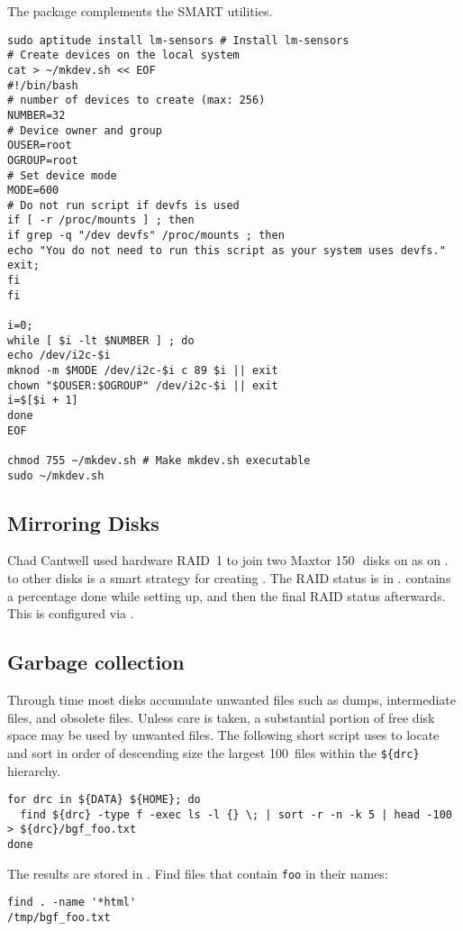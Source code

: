 \documentclass[12pt,twoside]{article}
\begin{document}
The  package complements the SMART utilities.
\begin{verbatim}
sudo aptitude install lm-sensors # Install lm-sensors
# Create devices on the local system
cat > ~/mkdev.sh << EOF
#!/bin/bash
# number of devices to create (max: 256)
NUMBER=32
# Device owner and group
OUSER=root
OGROUP=root
# Set device mode
MODE=600
# Do not run script if devfs is used
if [ -r /proc/mounts ] ; then
if grep -q "/dev devfs" /proc/mounts ; then
echo "You do not need to run this script as your system uses devfs."
exit;
fi
fi

i=0;
while [ $i -lt $NUMBER ] ; do
echo /dev/i2c-$i
mknod -m $MODE /dev/i2c-$i c 89 $i || exit
chown "$OUSER:$OGROUP" /dev/i2c-$i || exit
i=$[$i + 1]
done
EOF

chmod 755 ~/mkdev.sh # Make mkdev.sh executable
sudo ~/mkdev.sh

\end{verbatim}

\subsection{Mirroring Disks}\label{sxn:mrr}
Chad Cantwell used hardware RAID~1 to join two Maxtor 150\,\GB\ disks
on  as  on . 
 to other disks is a smart strategy for
creating .
The RAID status is in .
 contains a percentage done while setting up,
and then the final RAID status afterwards.
This is configured via .

\subsection{Garbage collection}\label{sxn:grb}
Through time most disks accumulate unwanted files such as
 dumps, intermediate files, and obsolete files.
Unless care is taken, a substantial portion of free disk space may be 
used by unwanted files.
The following short script uses  to locate and sort
in order of descending size the largest 100~files within the
\verb'${drc}' hierarchy.
\begin{verbatim}
for drc in ${DATA} ${HOME}; do
  find ${drc} -type f -exec ls -l {} \; | sort -r -n -k 5 | head -100 > ${drc}/bgf_foo.txt
done
\end{verbatim}
The results are stored in .
Find files that contain \verb'foo' in their names:
\begin{verbatim}
find . -name '*html'
/tmp/bgf_foo.txt
\end{verbatim}
\end{document}
